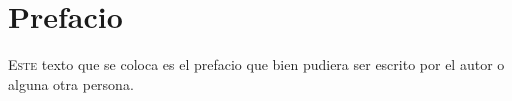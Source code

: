 \chapter*{Prefacio}
\pagestyle{especial}
{}
\thispagestyle{empty}

\lettrine[lraise=0, lines=4, loversize=0]{\textcolor{azulF}{E}}{ste} texto que se coloca es el prefacio que bien 
pudiera ser escrito por el autor o alguna otra persona.

\medskip

{}%
\vspace{-.3cm}
{}%
{}%
